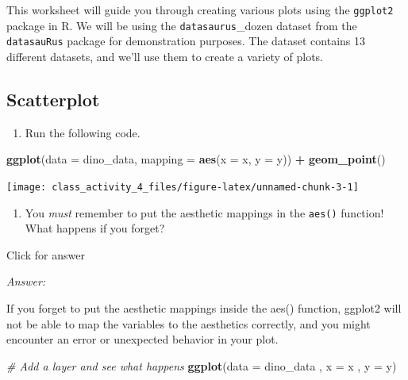 \documentclass[
]{book}
\newenvironment{Shaded}{\begin{snugshade}}{\end{snugshade}}
\newcommand{\AttributeTok}[1]{\textcolor[rgb]{0.13,0.29,0.53}{#1}}
\newcommand{\CommentTok}[1]{\textcolor[rgb]{0.56,0.35,0.01}{\textit{#1}}}
\newcommand{\FunctionTok}[1]{\textcolor[rgb]{0.13,0.29,0.53}{\textbf{#1}}}
\newcommand{\NormalTok}[1]{#1}
\newcommand{\SpecialCharTok}[1]{\textcolor[rgb]{0.81,0.36,0.00}{\textbf{#1}}}
\providecommand{\tightlist}{%
  \setlength{\itemsep}{0pt}\setlength{\parskip}{0pt}}
\begin{document}
This worksheet will guide you through creating various plots using the \texttt{ggplot2} package in R. We will be using the \texttt{datasaurus}\_dozen dataset from the \texttt{datasauRus} package for demonstration purposes. The dataset contains 13 different datasets, and we'll use them to create a variety of plots.

\hypertarget{scatterplot}{%
\subsection{Scatterplot}\label{scatterplot}}

\begin{enumerate}
\def\labelenumi{\alph{enumi}.}
\tightlist
\item
  Run the following code.
\end{enumerate}

\begin{Shaded}
\begin{Highlighting}[]
\FunctionTok{ggplot}\NormalTok{(}\AttributeTok{data =}\NormalTok{ dino\_data, }\AttributeTok{mapping =} \FunctionTok{aes}\NormalTok{(}\AttributeTok{x =}\NormalTok{ x, }\AttributeTok{y =}\NormalTok{ y)) }\SpecialCharTok{+}
  \FunctionTok{geom\_point}\NormalTok{()}
\end{Highlighting}
\end{Shaded}

\texttt{[image: class\_activity\_4\_files/figure-latex/unnamed-chunk-3-1]}

\begin{enumerate}
\def\labelenumi{\alph{enumi}.}
\setcounter{enumi}{1}
\tightlist
\item
  You \emph{must} remember to put the aesthetic mappings in the \texttt{aes()} function! What happens if you forget?
\end{enumerate}

Click for answer

\emph{Answer:}

If you forget to put the aesthetic mappings inside the aes() function, ggplot2 will not be able to map the variables to the aesthetics correctly, and you might encounter an error or unexpected behavior in your plot.

\begin{Shaded}
\begin{Highlighting}[]
\CommentTok{\# Add a layer and see what happens}
\FunctionTok{ggplot}\NormalTok{(}\AttributeTok{data =}\NormalTok{ dino\_data , }\AttributeTok{x =}\NormalTok{ x , }\AttributeTok{y =}\NormalTok{ y)}
\end{Highlighting}
\end{Shaded}
\end{document}
